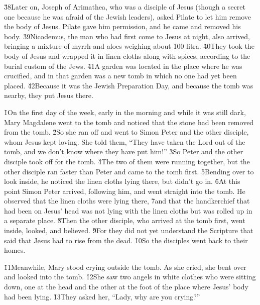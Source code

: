 \v{38}Later on, Joseph of Arimathea, who was a disciple of Jesus (though a secret one because he was afraid of the Jewish leaders), asked Pilate to let him remove the body of Jesus. Pilate gave him permission, and he came and removed his body. \v{39}Nicodemus, the man who had first come to Jesus at night, also arrived, bringing a mixture of myrrh and aloes weighing about 100 litra. \v{40}They took the body of Jesus and wrapped it in linen cloths along with spices, according to the burial custom of the Jews. \v{41}A garden was located in the place where he was crucified, and in that garden was a new tomb in which no one had yet been placed. \v{42}Because it was the Jewish Preparation Day, and because the tomb was nearby, they put Jesus there.

\v{1}On the first day of the week, early in the morning and while it was still dark, Mary Magdalene went to the tomb and noticed that the stone had been removed from the tomb. \v{2}So she ran off and went to Simon Peter and the other disciple, whom Jesus kept loving. She told them, ``They have taken the Lord out of the tomb, and we don't know where they have put him!'' \v{3}So Peter and the other disciple took off for the tomb. \v{4}The two of them were running together, but the other disciple ran faster than Peter and came to the tomb first. \v{5}Bending over to look inside, he noticed the linen cloths lying there, but didn't go in. \v{6}At this point Simon Peter arrived, following him, and went straight into the tomb. He observed that the linen cloths were lying there, \v{7}and that the handkerchief that had been on Jesus' head was not lying with the linen cloths but was rolled up in a separate place. \v{8}Then the other disciple, who arrived at the tomb first, went inside, looked, and believed. \v{9}For they did not yet understand the Scripture that said that Jesus had to rise from the dead. \v{10}So the disciples went back to their homes.

\v{11}Meanwhile, Mary stood crying outside the tomb. As she cried, she bent over and looked into the tomb. \v{12}She saw two angels in white clothes who were sitting down, one at the head and the other at the foot of the place where Jesus' body had been lying. \v{13}They asked her, ``Lady, why are you crying?''

